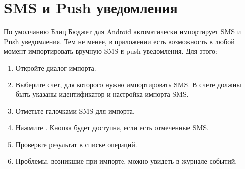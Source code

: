 \documentclass[a4paper,10pt,russian]{sphinxmanual}
\begin{document}
\section{SMS и Push уведомления}
\label{\detokenize{import:sms-push}}
По умолчанию Блиц Бюджет для Android автоматически импортирует SMS и Push уведомления. Тем не менее, в приложении есть возможность
в любой момент импортировать вручную SMS и push-уведомления. Для этого:
\begin{enumerate}
\def\theenumi{\arabic{enumi}}
\def\labelenumi{\theenumi .}
\makeatletter\def\p@enumii{\p@enumi \theenumi .}\makeatother
\item {} 
Откройте диалог импорта.

\item {} 
Выберите счет, для которого нужно импортировать SMS. В счете должны быть указаны идентификатор и настройка импорта SMS.

\item {} 
Отметьте галочками SMS для импорта.

\item {} 
Нажмите . Кнопка будет доступна, если есть отмеченные SMS.

\item {} 
Проверьте результат в списке операций.

\item {} 
Проблемы, возникшие при импорте, можно увидеть в журнале событий.

\end{enumerate}

\noindent{}

\noindent{}

\noindent{}

\noindent{}

\noindent{}

\noindent{}

\noindent{}

\noindent{}
\end{document}
